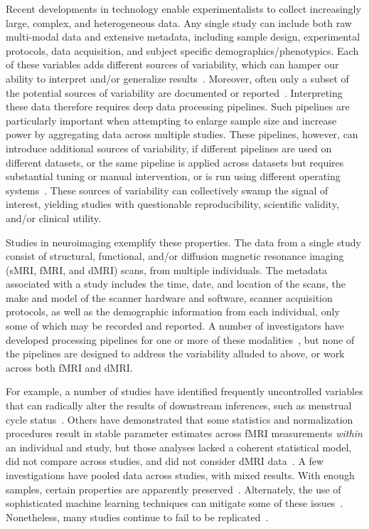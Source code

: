 \documentclass[11pt]{article}
\begin{document}
\begin{multicols}{2}
Recent developments in technology enable experimentalists to collect increasingly large, complex, and heterogeneous data. 
Any single study can include both raw multi-modal data and
extensive metadata, 
including sample design, experimental protocols,  data acquisition, and subject specific demographics/phenotypics. Each of these variables adds different sources of variability, which can hamper our ability to interpret and/or generalize results~\cite{Kelly2012, Kaiser}.  Moreover, often only a subset of the potential sources of variability are documented or reported~\cite{Yan2013-vy}.  
Interpreting these data therefore requires deep data processing pipelines. Such pipelines are particularly important when attempting to enlarge sample size and increase power by aggregating data across multiple studies. These pipelines, however, can introduce additional sources of variability, if different pipelines are used on different datasets, or the same pipeline is applied across datasets but requires substantial tuning or manual intervention, or is run using different operating systems~\cite{Gronenschild2012-of}.
These sources of variability can collectively swamp the signal of interest, yielding studies with questionable reproducibility, scientific validity, and/or clinical utility. 

Studies in neuroimaging exemplify these properties. The data from a single study consist of structural, functional, and/or diffusion magnetic resonance imaging (sMRI, fMRI, and dMRI) scans, from multiple individuals. The metadata associated with a study includes the time, date, and location of the scans, the make and model of the scanner hardware and software, scanner acquisition protocols, as well as the demographic information from each individual, only some of which may be recorded and reported. A number of investigators have developed  processing pipelines for one or more of these modalities~\cite{cpac, Cui2013, Daducci2012, mrcap, migraine, Song2011, Yan2010, Yan2016, Wang2015, Calhoun2001-wc, Xu2015,Zuo2013}, but none of the pipelines are designed to address the  variability alluded to above, or work across both fMRI and dMRI.  


For example, a number of studies have identified frequently uncontrolled  variables that can radically alter the results of downstream inferences, such as menstrual cycle status~\cite{Yan2013-vy}.
Others have demonstrated that some statistics and normalization procedures result in stable parameter estimates across fMRI measurements \emph{within} an individual and study, but those analyses lacked a coherent statistical model, did not compare across studies, and did not consider dMRI data~\cite{Yan2013-vy}. 
A few investigations have pooled data across studies, with mixed results. With enough samples, certain properties are apparently preserved~\cite{Thompson2016-by,Abrol2017-fk}. Alternately, the use of sophisticated machine learning techniques can mitigate some of these issues~\cite{varoquaux2013learning}. Nonetheless, many studies continue to fail to be replicated~\cite{Button2013}. 






\end{multicols}
\end{document}
